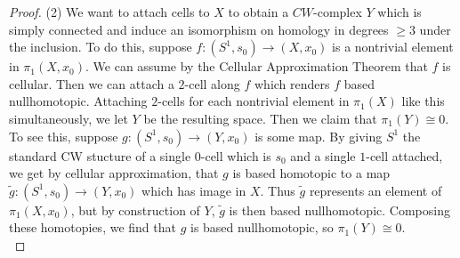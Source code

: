 \begin{proof}
        (2) We want to attach cells to $X$ to obtain
        a $CW$-complex $Y$ which is simply
        connected and induce an isomorphism on
        homology in degrees $\ge 3$ under the inclusion.
        To do this, suppose
        $f \colon \left( S^{1}, s_0 \right) 
        \to \left( X, x_0 \right) $ is
        a nontrivial element in $\pi_1 (X, x_0)$. We can assume
        by the Cellular Approximation Theorem that
        $f$ is cellular. Then
        we can attach a $2$-cell along $f$ which renders
        $f$ based nullhomotopic. Attaching $2$-cells for
        each nontrivial element in $\pi_1(X)$ like this simultaneously,
        we let $Y$ be the resulting space.
        Then we claim that $\pi_1 (Y) \cong 0$.
        To see this, suppose 
        $g \colon \left( S^{1}, s_0 \right) \to 
        \left( Y, x_0 \right) $ is some map. By
        giving $S^{1}$ the standard CW stucture of a single
        $0$-cell which is $s_0$ and a single $1$-cell attached,
        we get by cellular approximation, that
        $g$ is based homotopic to 
        a map $\tilde{g} \colon \left( S^{1}, s_0 \right) 
        \to \left( Y, x_0 \right) $ which has image
        in $X$. Thus $\tilde{g}$ represents
        an element of $\pi_1 \left( X, x_0 \right) $,
        but by construction of $Y$, $\tilde{g}$ is then
        based nullhomotopic. Composing these homotopies,
        we find that $g$ is based nullhomotopic, so
        $\pi_1 \left( Y \right) \cong 0$.\\
        \linebreak
        

\end{proof}
